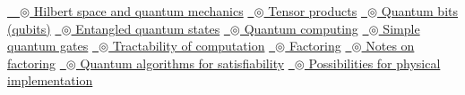 \documentclass{article}
\def\tthdump#1{#1}
\begin{document}
\tthdump{\hyperlink{Hilbert space and quantum mechanics}
               {\ \ $\circledcirc$ Hilbert space and quantum mechanics\newline}}
\tthdump{\hyperlink{Tensor products}
               {\ $\circledcirc$ Tensor products\newline}}
\tthdump{\hyperlink{Quantum bits (qubits)}
               {\ $\circledcirc$ Quantum bits (qubits)\newline}}
\tthdump{\hyperlink{Entangled quantum states}
               {\ $\circledcirc$ Entangled quantum states\newline}}
\tthdump{\hyperlink{Quantum computing}
               {\ $\circledcirc$ Quantum computing\newline}}
\tthdump{\hyperlink{Simple quantum gates}
               {\ $\circledcirc$ Simple quantum gates\newline}}
\tthdump{\hyperlink{Tractability of computation}
               {\ $\circledcirc$ Tractability of computation\newline}}
\tthdump{\hyperlink{Factoring}
               {\ $\circledcirc$ Factoring\newline}}
\tthdump{\hyperlink{Notes on factoring}
               {\ $\circledcirc$ Notes on factoring\newline}}
\tthdump{\hyperlink{Quantum algorithms for satisfiability}
               {\ $\circledcirc$ Quantum algorithms for satisfiability\newline}}
\tthdump{\hyperlink{Possibilities for physical implementation}
               {\ $\circledcirc$ Possibilities for physical implementation\newline}}
\end{document}
